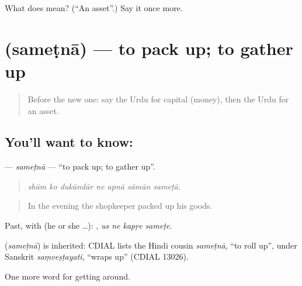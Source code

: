 \begin{tcolorbox}[breakable,colback=teal!4,colframe=teal!35!black,title={Before you move on}]
What does  mean? (\textquotedblleft{}An asset\textquotedblright{}.) Say it once more.
\end{tcolorbox}
\section[\texorpdfstring{\ur{سمیٹنا} (sameṭnā)}{سمیٹنا (sameṭnā)}]{ (sameṭnā) — to pack up; to gather up}

\label{lesson:UR-C419-sametna}



\begin{quote}
Before the new one: say the Urdu for capital (money), then the Urdu for an asset.
\end{quote}

\subsection*{You'll want to know: }
\textbf{} — \emph{sameṭnā} — \textquotedblleft{}to pack up; to gather up\textquotedblright{}.

\begin{quote}
      
\end{quote}

\begin{quote}
\emph{shām ko dukāndār ne apnā sāmān sameṭā.}
\end{quote}

\begin{quote}
In the evening the shopkeeper packed up his goods.
\end{quote}

Past, with  (he or she …):    , \emph{us ne kapṛe sameṭe}.

\begin{cousinweb}
\textbf{} (\emph{sameṭnā}) is inherited: CDIAL lists the Hindi cousin \emph{sameṭnā}, \textquotedblleft{}to roll up\textquotedblright{}, under Sanskrit \emph{saṃveṣṭayati}, \textquotedblleft{}wraps up\textquotedblright{} (CDIAL 13026).
\end{cousinweb}

\begin{grammarlens}[title={What you've built}]
One more word for getting around.
\end{grammarlens}

